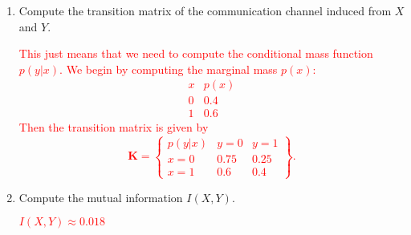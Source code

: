 \documentclass[12pt,reqno]{amsart}
\begin{document}
\bigskip
\begin{enumerate}
\item Compute the transition matrix of the communication channel induced from $X$ and $Y$.

\bigskip
\textcolor{red}{This just means that we need to compute the conditional mass function $p(y|x)$. We begin by computing the marginal mass $p(x)$:
	\[\begin{array}{c|c}
	x & p(x) \\ \hline
	0 & 0.4 \\
	1 & 0.6
	\end{array}
	\]
Then the transition matrix is given by
	\[\mathbf{K} = \left\{\begin{array}{c|cc}
	p(y|x) & y=0 & y=1 \\ \hline
	x = 0 & 0.75 & 0.25 \\
	x = 1 & 0.6 & 0.4
	\end{array}\right\}.
	\]}
\bigskip

\item Compute the mutual information $I(X,Y)$.

\bigskip
\textcolor{red}{$I(X,Y) \approx 0.018$}
\bigskip
\end{enumerate}
\end{document}
